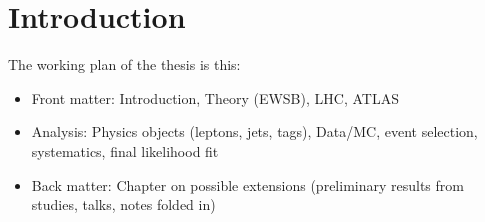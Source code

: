 \chapter{Introduction}
\label{introduction}

The working plan of the thesis is this:

\begin{itemize}
\item Front matter: Introduction, Theory (EWSB), LHC, ATLAS
\item Analysis: Physics objects (leptons, jets, tags), Data/MC, event selection, systematics, final likelihood fit
\item Back matter: Chapter on possible extensions (preliminary results from studies, talks, notes folded in)
\end{itemize}

